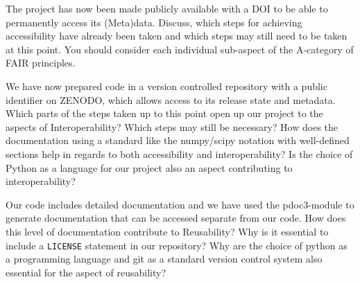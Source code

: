\documentclass[]{erlangen-problemset}
\begin{document}
\begin{problem}[title={FAIR principles - Accessibility}]
\noindent The project has now been made publicly available with a DOI to be able to permanently access its (Meta)data.
\Question Discuss, which steps for achieving accessibility have already been taken and which steps may still need to be taken at this point.
You should consider each individual sub-aspect of the A-category of FAIR principles.
\end{problem}

\begin{problem}[title={FAIR principles - Interoperability}]
\noindent We have now prepared code in a version controlled repository with a public identifier on ZENODO, which allows access to its release state and metadata. 
\Question Which parts of the steps taken up to this point open up our project to the aspects of Interoperability?
\Question Which steps may still be necessary?
\Question How does the documentation using a standard like the numpy/scipy notation with well-defined sections help in regards to both accessibility and interoperability?
\Question Is the choice of Python as a language for our project also an aspect contributing to interoperability?
\end{problem}

\begin{problem}[title={FAIR principles - Reusability}]
\noindent Our code includes detailed documentation and we have used the pdoc3-module to generate documentation that can be accessed separate from our code.
\Question How does this level of documentation contribute to Reusability?
\Question Why is it essential to include a \texttt{LICENSE} statement in our repository?
\Question Why are the choice of python as a programming language and git as a standard version control system also essential for the aspect of reusability?
\end{problem}
\end{document}
